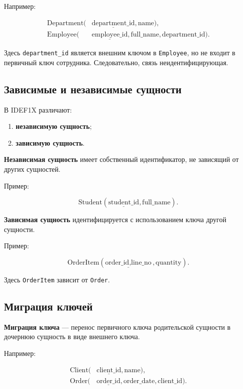 \documentclass[12pt,a4paper]{article}
\theoremstyle{remark}
\begin{document}
Например:

\[
\begin{aligned}
    \text{Department}(&\underline{\text{department\_id}}, \text{name}),\\
    \text{Employee}(&\underline{\text{employee\_id}}, \text{full\_name}, \text{department\_id}).
\end{aligned}
\]

Здесь \texttt{department\_id} является внешним ключом в \texttt{Employee}, но не входит в первичный ключ сотрудника. Следовательно, связь неидентифицирующая.

\subsection{Зависимые и независимые сущности}

В IDEF1X различают:

\begin{enumerate}
    \item \textbf{независимую сущность};
    \item \textbf{зависимую сущность}.
\end{enumerate}

\textbf{Независимая сущность} имеет собственный идентификатор, не зависящий от других сущностей.

Пример:

\[
    \text{Student}(\underline{\text{student\_id}}, \text{full\_name}).
\]

\textbf{Зависимая сущность} идентифицируется с использованием ключа другой сущности.

Пример:

\[
    \text{OrderItem}(\underline{\text{order\_id}, \text{line\_no}}, \text{quantity}).
\]

Здесь \texttt{OrderItem} зависит от \texttt{Order}.

\subsection{Миграция ключей}

\textbf{Миграция ключа} --- перенос первичного ключа родительской сущности в дочернюю сущность в виде внешнего ключа.

Например:

\[
\begin{aligned}
    \text{Client}(&\underline{\text{client\_id}}, \text{name}),\\
    \text{Order}(&\underline{\text{order\_id}}, \text{order\_date}, \text{client\_id}).
\end{aligned}
\]
\end{document}
